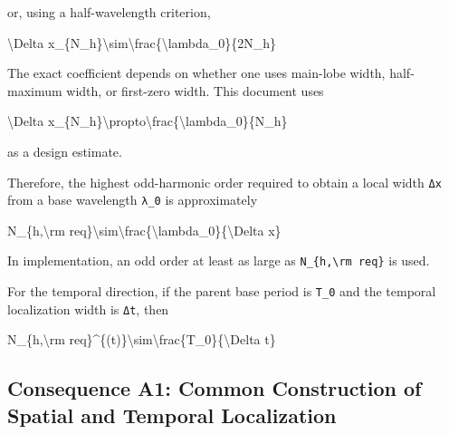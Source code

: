 \documentclass[
  a4paper]{article}
\newenvironment{Shaded}{}{}
\newcommand{\NormalTok}[1]{#1}
\begin{document}
or, using a half-wavelength criterion,

\begin{Shaded}
\begin{Highlighting}[]
\NormalTok{\textbackslash{}Delta x\_\{N\_h\}\textbackslash{}sim\textbackslash{}frac\{\textbackslash{}lambda\_0\}\{2N\_h\}}
\end{Highlighting}
\end{Shaded}

The exact coefficient depends on whether one uses main-lobe width,
half-maximum width, or first-zero width. This document uses

\begin{Shaded}
\begin{Highlighting}[]
\NormalTok{\textbackslash{}Delta x\_\{N\_h\}\textbackslash{}propto\textbackslash{}frac\{\textbackslash{}lambda\_0\}\{N\_h\}}
\end{Highlighting}
\end{Shaded}

as a design estimate.

Therefore, the highest odd-harmonic order required to obtain a local
width \texttt{Δx} from a base wavelength \texttt{λ\_0} is approximately

\begin{Shaded}
\begin{Highlighting}[]
\NormalTok{N\_\{h,\textbackslash{}rm req\}\textbackslash{}sim\textbackslash{}frac\{\textbackslash{}lambda\_0\}\{\textbackslash{}Delta x\}}
\end{Highlighting}
\end{Shaded}

In implementation, an odd order at least as large as
\texttt{N\_\{h,\textbackslash{}rm\ req\}} is used.

For the temporal direction, if the parent base period is \texttt{T\_0}
and the temporal localization width is \texttt{Δt}, then

\begin{Shaded}
\begin{Highlighting}[]
\NormalTok{N\_\{h,\textbackslash{}rm req\}\^{}\{(t)\}\textbackslash{}sim\textbackslash{}frac\{T\_0\}\{\textbackslash{}Delta t\}}
\end{Highlighting}
\end{Shaded}

\subsection{Consequence A1: Common Construction of Spatial and Temporal
Localization}\label{consequence-a1-common-construction-of-spatial-and-temporal-localization}
\end{document}
